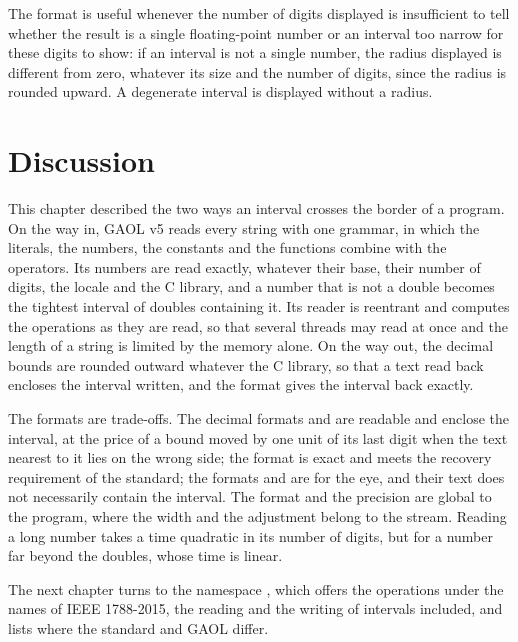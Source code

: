 The format  is useful whenever the number of digits
displayed is insufficient to tell whether the result is a single
floating-point number or an interval too narrow for these digits to show:
      if an interval is not a single
number, the radius displayed is different from zero, whatever its size and
the number of digits, since the radius is rounded upward. A degenerate
interval is displayed without a radius.

\section{Discussion}

This chapter described the two ways an interval crosses the border of a
program. On the way in, GAOL v5 reads every string with one grammar, in
which the literals, the numbers, the constants and the functions combine
with the operators. Its numbers are read exactly, whatever their base, their
number of digits, the locale and the C library, and a number that is not a
double becomes the tightest interval of doubles containing it. Its reader
is reentrant and computes the operations as they are read, so that several
threads may read at once and the length of a string is limited by the
memory alone. On the way out, the decimal bounds are rounded outward
whatever the C library, so that a text read back encloses the interval
written, and the format  gives the interval back exactly.

\medskip
The formats are trade-offs. The decimal formats  and
 are readable and enclose the interval, at the price of a
bound moved by one unit of its last digit when the text nearest to it lies
on the wrong side; the format  is exact and meets the recovery
requirement of the standard; the formats  and
 are for the eye, and their text does not necessarily
contain the interval. The format and the precision are global to the
program, where the width and the adjustment belong to the stream. Reading a
long number takes a time quadratic in its number of digits, but for a number
far beyond the doubles, whose time is linear.

\medskip
The next chapter turns to the namespace , which offers
the operations under the names of IEEE 1788-2015, the reading and the
writing of intervals included, and lists where the standard and GAOL
differ.
